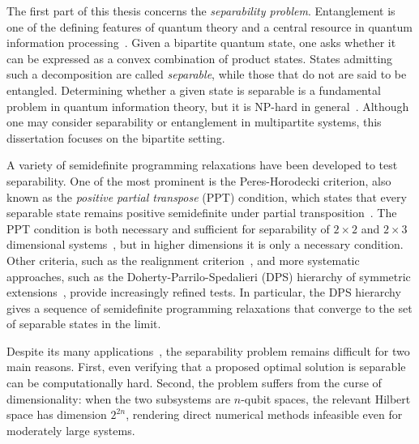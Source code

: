 The first part of this thesis concerns the \emph{separability problem}. 
Entanglement is one of the defining features of quantum theory and a central resource in quantum information processing~\cite{horodecki2009quantum}. 
Given a bipartite quantum state, one asks whether it can be expressed as a convex combination of product states. 
States admitting such a decomposition are called \emph{separable}, while those that do not are said to be entangled. 
Determining whether a given state is separable is a fundamental problem in quantum information theory, but it is NP-hard in general~\cite{gurvits2004classical,gharibian2010strong}. 
Although one may consider separability or entanglement in multipartite systems, this dissertation focuses on the bipartite setting.

A variety of semidefinite programming relaxations have been developed to test separability. 
One of the most prominent is the Peres-Horodecki criterion, also known as the \emph{positive partial transpose} (PPT) condition, which states that every separable state remains positive semidefinite under partial transposition~\cite{peres1996separability, horodecki1996necessary}. 
The PPT condition is both necessary and sufficient for separability of $2 \times 2$ and $2 \times 3$ dimensional systems~\cite{horodecki1996necessary}, but in higher dimensions it is only a necessary condition. 
Other criteria, such as the realignment criterion~\cite{chen2003matrix,rudolph2005further}, and more systematic approaches, such as the Doherty-Parrilo-Spedalieri (DPS) hierarchy of symmetric extensions~\cite{doherty2002SymExt, doherty2004complete}, provide increasingly refined tests. 
In particular, the DPS hierarchy gives a sequence of semidefinite programming relaxations that converge to the set of separable states in the limit.

Despite its many applications~\cite{ioannou2007computational, brandao2011quasipolynomial, gharibian2013qma, chailloux2012complexity, hayden2013two, harrow2013testing, li2014quantum, consiglio2022variational, jeronimo2023power}, the separability problem remains difficult for two main reasons. 
First, even verifying that a proposed optimal solution is separable can be computationally hard. 
Second, the problem suffers from the curse of dimensionality: when the two subsystems are $n$-qubit spaces, the relevant Hilbert space has dimension $2^{2n}$, rendering direct numerical methods infeasible even for moderately large systems.

